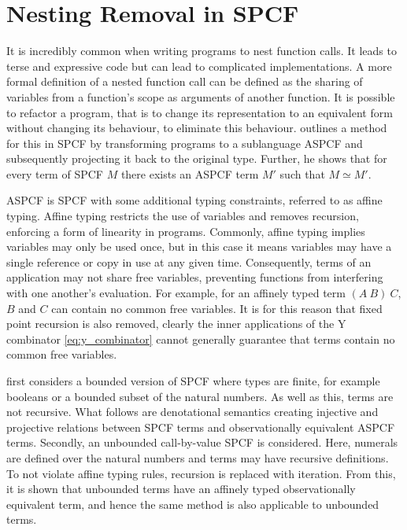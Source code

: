 \documentclass[12pt,a4paper]{report}
\theoremstyle{definition}
\theoremstyle{remark}
\begin{document}
\section{Nesting Removal in SPCF}\label{sec:nesting_removal}
It is incredibly common when writing programs to nest function calls. It leads to terse and expressive code but can lead to complicated implementations. A more formal definition of a nested function call can be defined as the sharing of variables from a function's scope as arguments of another function. It is possible to refactor a program, that is to change its representation to an equivalent form without changing its behaviour, to eliminate this behaviour. \cite{laird_2007} outlines a method for this in SPCF by transforming programs to a sublanguage ASPCF and subsequently projecting it back to the original type. Further, he shows that for every term of SPCF $M$ there exists an ASPCF term $M'$ such that $M \simeq M'$.

ASPCF is SPCF with some additional typing constraints, referred to as affine typing. Affine typing restricts the use of variables and removes recursion, enforcing a form of linearity in programs. Commonly, affine typing implies variables may only be used once, but in this case it means variables may have a single reference or copy in use at any given time. Consequently, terms of an application may not share free variables, preventing functions from interfering with one another's evaluation. For example, for an affinely typed term $(A\ B)\ C$, $B$ and $C$ can contain no common free variables. It is for this reason that fixed point recursion is also removed, clearly the inner applications of the Y combinator \eqref{eq:y_combinator} cannot generally guarantee that terms contain no common free variables.

\cite{laird_2007} first considers a bounded version of SPCF where types are finite, for example booleans or a bounded subset of the natural numbers. As well as this, terms are not recursive. What follows are denotational semantics creating injective and projective relations between SPCF terms and observationally equivalent ASPCF terms. Secondly, an unbounded call-by-value SPCF is considered. Here, numerals are defined over the natural numbers and terms may have recursive definitions. To not violate affine typing rules, recursion is replaced with iteration. From this, it is shown that unbounded terms have an affinely typed observationally equivalent term, and hence the same method is also applicable to unbounded terms.
\end{document}
